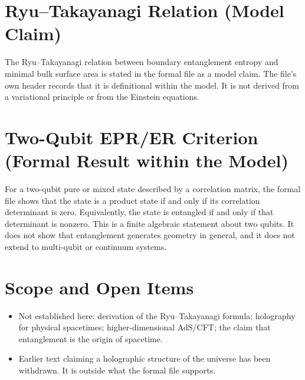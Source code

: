 \documentclass[11pt, a4paper]{article}
\begin{document}
\section{Ryu--Takayanagi Relation (Model Claim)}
The Ryu--Takayanagi relation between boundary entanglement entropy and minimal bulk surface area is stated in the formal file as a model claim. The file's own header records that it is definitional within the model. It is not derived from a variational principle or from the Einstein equations.

\section{Two-Qubit EPR/ER Criterion (Formal Result within the Model)}
For a two-qubit pure or mixed state described by a correlation matrix, the formal file shows that the state is a product state if and only if its correlation determinant is zero. Equivalently, the state is entangled if and only if that determinant is nonzero. This is a finite algebraic statement about two qubits. It does not show that entanglement generates geometry in general, and it does not extend to multi-qubit or continuum systems.

\section{Scope and Open Items}
\begin{itemize}
  \item Not established here: derivation of the Ryu--Takayanagi formula; holography for physical spacetimes; higher-dimensional AdS/CFT; the claim that entanglement is the origin of spacetime.
  \item Earlier text claiming a holographic structure of the universe has been withdrawn. It is outside what the formal file supports.
\end{itemize}
\end{document}
